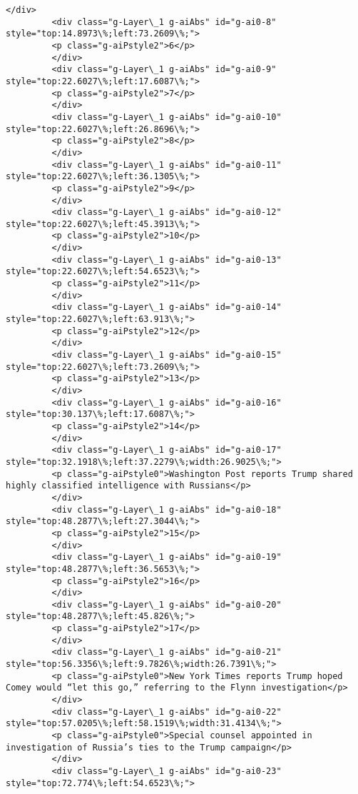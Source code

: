 \documentclass[11pt]{article}
\begin{document}
\begin{Verbatim}[commandchars=\\\{\}]
         </div>
         <div class="g-Layer\_1 g-aiAbs" id="g-ai0-8" style="top:14.8973\%;left:73.2609\%;">
         <p class="g-aiPstyle2">6</p>
         </div>
         <div class="g-Layer\_1 g-aiAbs" id="g-ai0-9" style="top:22.6027\%;left:17.6087\%;">
         <p class="g-aiPstyle2">7</p>
         </div>
         <div class="g-Layer\_1 g-aiAbs" id="g-ai0-10" style="top:22.6027\%;left:26.8696\%;">
         <p class="g-aiPstyle2">8</p>
         </div>
         <div class="g-Layer\_1 g-aiAbs" id="g-ai0-11" style="top:22.6027\%;left:36.1305\%;">
         <p class="g-aiPstyle2">9</p>
         </div>
         <div class="g-Layer\_1 g-aiAbs" id="g-ai0-12" style="top:22.6027\%;left:45.3913\%;">
         <p class="g-aiPstyle2">10</p>
         </div>
         <div class="g-Layer\_1 g-aiAbs" id="g-ai0-13" style="top:22.6027\%;left:54.6523\%;">
         <p class="g-aiPstyle2">11</p>
         </div>
         <div class="g-Layer\_1 g-aiAbs" id="g-ai0-14" style="top:22.6027\%;left:63.913\%;">
         <p class="g-aiPstyle2">12</p>
         </div>
         <div class="g-Layer\_1 g-aiAbs" id="g-ai0-15" style="top:22.6027\%;left:73.2609\%;">
         <p class="g-aiPstyle2">13</p>
         </div>
         <div class="g-Layer\_1 g-aiAbs" id="g-ai0-16" style="top:30.137\%;left:17.6087\%;">
         <p class="g-aiPstyle2">14</p>
         </div>
         <div class="g-Layer\_1 g-aiAbs" id="g-ai0-17" style="top:32.1918\%;left:37.2279\%;width:26.9025\%;">
         <p class="g-aiPstyle0">Washington Post reports Trump shared highly classified intelligence with Russians</p>
         </div>
         <div class="g-Layer\_1 g-aiAbs" id="g-ai0-18" style="top:48.2877\%;left:27.3044\%;">
         <p class="g-aiPstyle2">15</p>
         </div>
         <div class="g-Layer\_1 g-aiAbs" id="g-ai0-19" style="top:48.2877\%;left:36.5653\%;">
         <p class="g-aiPstyle2">16</p>
         </div>
         <div class="g-Layer\_1 g-aiAbs" id="g-ai0-20" style="top:48.2877\%;left:45.826\%;">
         <p class="g-aiPstyle2">17</p>
         </div>
         <div class="g-Layer\_1 g-aiAbs" id="g-ai0-21" style="top:56.3356\%;left:9.7826\%;width:26.7391\%;">
         <p class="g-aiPstyle0">New York Times reports Trump hoped Comey would “let this go,” referring to the Flynn investigation</p>
         </div>
         <div class="g-Layer\_1 g-aiAbs" id="g-ai0-22" style="top:57.0205\%;left:58.1519\%;width:31.4134\%;">
         <p class="g-aiPstyle0">Special counsel appointed in investigation of Russia’s ties to the Trump campaign</p>
         </div>
         <div class="g-Layer\_1 g-aiAbs" id="g-ai0-23" style="top:72.774\%;left:54.6523\%;">

\end{Verbatim}
\end{document}
